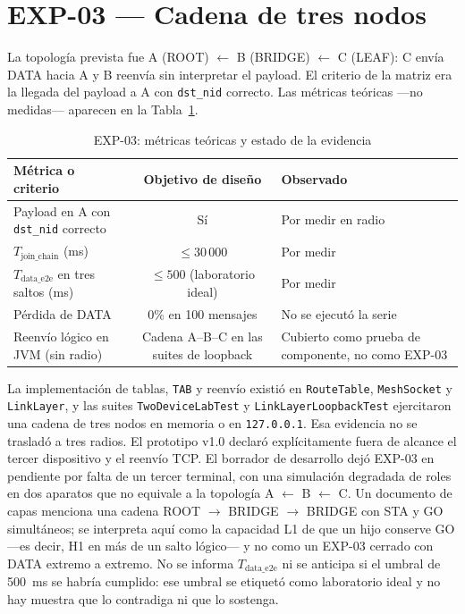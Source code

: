 \documentclass[12pt,oneside]{scrreprt}
\begin{document}
\iffalse
\section{EXP-03 --- Cadena de tres nodos}

La topología prevista fue A (ROOT) $\leftarrow$ B (BRIDGE) $\leftarrow$ C (LEAF): C envía DATA hacia A y B reenvía sin interpretar el payload. El criterio de la matriz era la llegada del payload a A con \texttt{dst\_nid} correcto. Las métricas teóricas ---no medidas--- aparecen en la Tabla~\ref{tab:exp03}.

\begin{table}[H]
\centering
\singlespacing
\caption{EXP-03: métricas teóricas y estado de la evidencia}
\label{tab:exp03}
\renewcommand{\arraystretch}{1.15}
\begin{tabularx}{\textwidth}{@{} >{\raggedright\arraybackslash}p{5.2cm} c X @{}}
\toprule
\textbf{Métrica o criterio} & \textbf{Objetivo de diseño} & \textbf{Observado} \\
\midrule
Payload en A con \texttt{dst\_nid} correcto & Sí & Por medir en radio \\
$T_{\mathrm{join\_chain}}$ (ms) & $\leq 30\,000$ & Por medir \\
$T_{\mathrm{data\_e2e}}$ en tres saltos (ms) & $\leq 500$ (laboratorio ideal) & Por medir \\
Pérdida de DATA & 0\% en 100 mensajes & No se ejecutó la serie \\
Reenvío lógico en JVM (sin radio) & Cadena A--B--C en las suites de loopback & Cubierto como prueba de componente, no como EXP-03 \\
\bottomrule
\end{tabularx}
\end{table}

La implementación de tablas, \texttt{TAB} y reenvío existió en \texttt{RouteTable}, \texttt{MeshSocket} y \texttt{LinkLayer}, y las suites \texttt{TwoDeviceLabTest} y \texttt{LinkLayerLoopbackTest} ejercitaron una cadena de tres nodos en memoria o en \texttt{127.0.0.1}. Esa evidencia no se trasladó a tres radios. El prototipo v1.0 declaró explícitamente fuera de alcance el tercer dispositivo y el reenvío TCP. El borrador de desarrollo dejó EXP-03 en pendiente por falta de un tercer terminal, con una simulación degradada de roles en dos aparatos que no equivale a la topología A $\leftarrow$ B $\leftarrow$ C. Un documento de capas menciona una cadena ROOT $\rightarrow$ BRIDGE $\rightarrow$ BRIDGE con STA y GO simultáneos; se interpreta aquí como la capacidad L1 de que un hijo conserve GO ---es decir, H1 en más de un salto lógico--- y no como un EXP-03 cerrado con DATA extremo a extremo. No se informa $T_{\mathrm{data\_e2e}}$ ni se anticipa si el umbral de 500~ms se habría cumplido: ese umbral se etiquetó como laboratorio ideal y no hay muestra que lo contradiga ni que lo sostenga.
\end{document}
